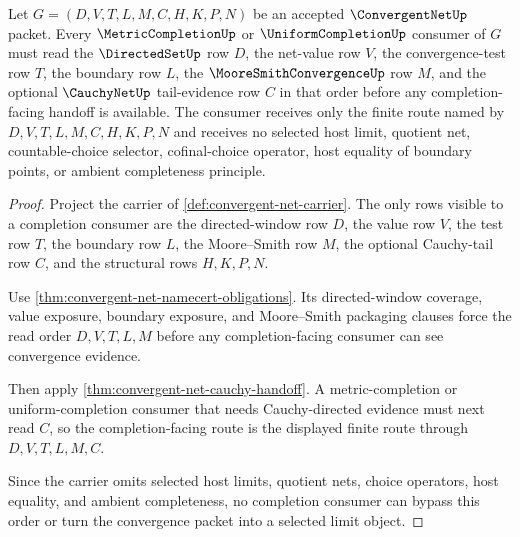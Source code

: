 \begin{theorem}
\label{thm:convergent-net-completion-consumer-boundary}
Let $G=(D,V,T,L,M,C,H,K,P,N)$ be an accepted $\ConvergentNetUp$ packet. Every $\MetricCompletionUp$ or $\UniformCompletionUp$ consumer of $G$ must read the $\DirectedSetUp$ row $D$, the net-value row $V$, the convergence-test row $T$, the boundary row $L$, the $\MooreSmithConvergenceUp$ row $M$, and the optional $\CauchyNetUp$ tail-evidence row $C$ in that order before any completion-facing handoff is available. The consumer receives only the finite route named by $D,V,T,L,M,C,H,K,P,N$ and receives no selected host limit, quotient net, countable-choice selector, cofinal-choice operator, host equality of boundary points, or ambient completeness principle.
\end{theorem}
\begin{proof}
Project the carrier of \autoref{def:convergent-net-carrier}. The only rows visible to a completion consumer are the directed-window row $D$, the value row $V$, the test row $T$, the boundary row $L$, the Moore--Smith row $M$, the optional Cauchy-tail row $C$, and the structural rows $H,K,P,N$.

Use \autoref{thm:convergent-net-namecert-obligations}. Its directed-window coverage, value exposure, boundary exposure, and Moore--Smith packaging clauses force the read order $D,V,T,L,M$ before any completion-facing consumer can see convergence evidence.

Then apply \autoref{thm:convergent-net-cauchy-handoff}. A metric-completion or uniform-completion consumer that needs Cauchy-directed evidence must next read $C$, so the completion-facing route is the displayed finite route through $D,V,T,L,M,C$.

Since the carrier omits selected host limits, quotient nets, choice operators, host equality, and ambient completeness, no completion consumer can bypass this order or turn the convergence packet into a selected limit object.
\end{proof}

